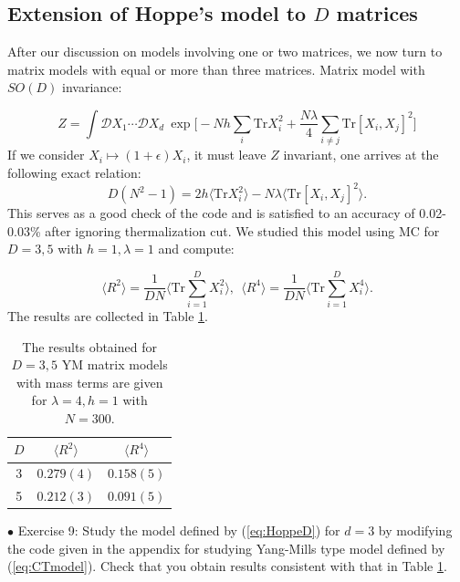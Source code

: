 \documentclass[11pt]{article}
\begin{document}
\subsection{\label{subsec:ext_Hoppe}Extension of Hoppe's model to $D$ matrices}


After our discussion on models involving one or two matrices, we now turn to matrix models 
with equal or more than three matrices. Matrix model with $SO(D)$ invariance:

\begin{equation}
\label{eq:HoppeD} 
	Z = \int \mathcal{D}X_1 \cdots \mathcal{D}X_d ~
	\exp\Big[ -Nh\sum_{i}\mbox{Tr}X_{i}^{2} + \frac{N\lambda}{4} \sum_{i \neq j} \mbox{Tr} [X_i,X_j]^{2}\Big]
\end{equation}
If we consider $X_i \mapsto (1+\epsilon) X_i$, it must leave $Z$ invariant, one arrives at the following exact relation: 
\begin{equation}
	D(N^2 -1) = 2 h \langle \mbox{Tr}X_{i}^{2} \rangle 
	- N \lambda \langle \mbox{Tr}[X_i,X_j]^{2} \rangle. 
\end{equation}
This serves as a good check of the code and is satisfied to an accuracy of 0.02-0.03\% after ignoring thermalization cut. We studied this model using MC for $D=3,5$ with $h=1, \lambda=1$ and compute: 

\begin{equation}
\label{eq:R2R4} 
	\langle R^2 \rangle =   \frac{1}{DN} \Bigg \langle \mbox{Tr} \sum_{i=1}^{D} X_{i}^2 \bigg \rangle, 
	~~ \langle R^4 \rangle =   \frac{1}{DN} \Bigg \langle \mbox{Tr} \sum_{i=1}^{D} X_{i}^4 \bigg \rangle.  
\end{equation}
The results are collected in Table \ref{table:D_YMM_data}. 

\begin{table}[h!]
	\centering
	\begin{tabular}{||c c c||} 
		\hline
		$D$ & $ \langle R^2 \rangle$ & $ \langle R^4 \rangle$ \\ [0.5ex] 
		\hline\hline
		3 & $ 0.279(4) $ & $ 0.158(5) $  \\ 
		5 & $ 0.212(3) $ & $ 0.091(5) $
		 \\ [1ex] 
		\hline 
	\end{tabular}
\caption{The results obtained for $D = 3,5$ YM matrix models with mass terms are given for $\lambda=4, h=1$ with $N=300$.}
\label{table:D_YMM_data}
\end{table}


\begin{mdframed}[backgroundcolor=blue!3] 
	\textsc{} 
	$\bullet$ Exercise 9: Study the model defined by (\ref{eq:HoppeD}) for $d=3$ by modifying the code given in the appendix for studying Yang-Mills type model defined by (\ref{eq:CTmodel}). Check that you obtain results consistent
	with that in Table \ref{table:D_YMM_data}.  
\end{mdframed}
\end{document}
